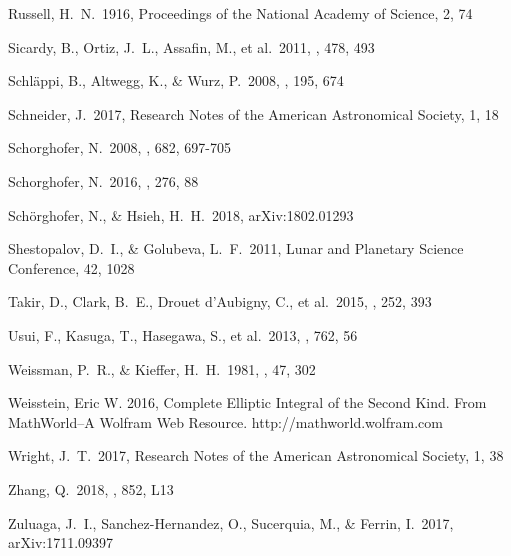 \documentclass[a4paper,fleqn,usenatbib]{mnras}
\begin{document}
\begin{thebibliography}{99}
 Russell, H.~N.\ 1916, Proceedings of the National Academy of Science, 2, 74 

 Sicardy, B., Ortiz, J.~L., Assafin, M., et al.\ 2011, \nat, 478, 493 

 Schl{\"a}ppi, B., Altwegg, K., \& Wurz, P.\ 2008, \icarus, 195, 674 

 Schneider, J.\ 2017, Research Notes of the American Astronomical Society, 1, 18

 Schorghofer, N.\ 2008, \apj, 682, 697-705 

 Schorghofer, N.\ 2016, \icarus, 276, 88

 Sch{\"o}rghofer, N., \& Hsieh, H.~H.\ 2018, arXiv:1802.01293

 Shestopalov, D.~I., \& Golubeva, L.~F.\ 2011, Lunar and Planetary Science Conference, 42, 1028

 Takir, D., Clark, B.~E., Drouet d'Aubigny, C., et al.\ 2015, \icarus, 252, 393 

 Usui, F., Kasuga, T., Hasegawa, S., et al.\ 2013, \apj, 762, 56 

 Weissman, P.~R., \& Kieffer, H.~H.\ 1981, \icarus, 47, 302 

 Weisstein, Eric W. 2016, Complete Elliptic Integral of the Second Kind. From MathWorld--A Wolfram Web Resource. http://mathworld.wolfram.com

 Wright, J.~T.\ 2017, Research Notes of the American Astronomical Society, 1, 38 

 Zhang, Q.\ 2018, \apjl, 852, L13

 Zuluaga, J.~I., Sanchez-Hernandez, O., Sucerquia, M., \& Ferrin, I.\ 2017, arXiv:1711.09397

\end{thebibliography}

\end{document}
